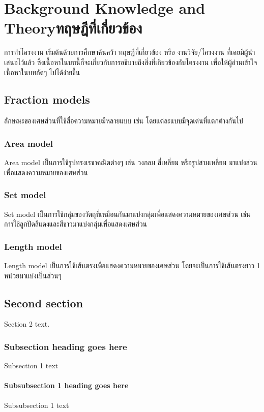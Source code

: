 \chapter{\ifenglish Background Knowledge and Theory\else ทฤษฎีที่เกี่ยวข้อง\fi}

การทำโครงงาน เริ่มต้นด้วยการศึกษาค้นคว้า ทฤษฎีที่เกี่ยวข้อง หรือ งานวิจัย/โครงงาน ที่เคยมีผู้นำเสนอไว้แล้ว ซึ่งเนื้อหาในบทนี้ก็จะเกี่ยวกับการอธิบายถึงสิ่งที่เกี่ยวข้องกับโครงงาน เพื่อให้ผู้อ่านเข้าใจเนื้อหาในบทถัดๆ ไปได้ง่ายขึ้น

\section{Fraction models}
ลักษณะของเศษส่วนที่ใช้สื่อความหมายมีหลายแบบ เช่น โดยแต่ละแบบมีจุดเด่นที่แตกต่างกันไป

\subsection{Area model}
Area model เป็นการใช้รูปทรงเรขาคณิตต่างๆ เช่น วงกลม สี่เหลี่ยม หรือรูปสามเหลี่ยม มาแบ่งส่วนเพื่อแสดงความหมายของเศษส่วน

\subsection{Set model}
Set model เป็นการใช้กลุ่มของวัตถุที่เหมือนกันมาแบ่งกลุ่มเพื่อแสดงความหมายของเศษส่วน เช่น การใช้ลูกปัดสีแดงและสีขาวมาแบ่งกลุ่มเพื่อแสดงเศษส่วน

\subsection{Length model}
Length model เป็นการใช้เส้นตรงเพื่อแสดงความหมายของเศษส่วน โดยจะเป็นการใช้เส้นตรงยาว 1 หน่วยมาแบ่งเป็นส่วนๆ

\section{Second section}
Section 2 text.

\subsection{Subsection heading goes here}

Subsection 1 text

\subsubsection{Subsubsection 1 heading goes here}
Subsubsection 1 text

